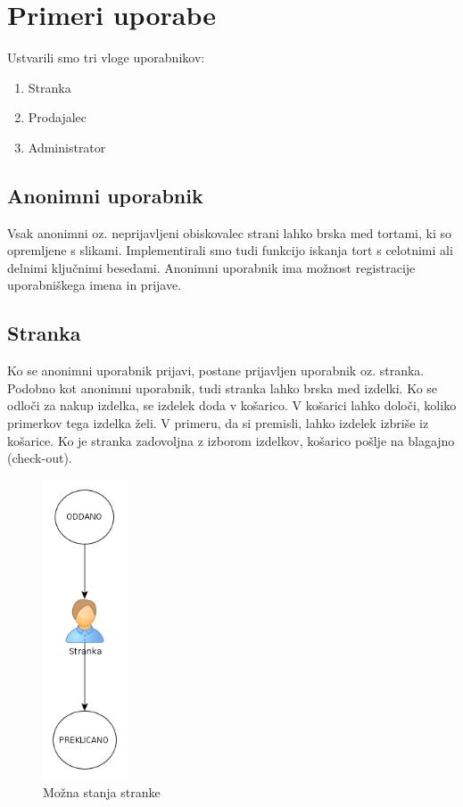 \documentclass[a4paper,12pt]{report}
\begin{document}

\chapter{Primeri uporabe}


Ustvarili smo tri vloge uporabnikov:
\begin{enumerate}
  \item Stranka
  \item Prodajalec
  \item Administrator
\end{enumerate}

\section{Anonimni uporabnik}

Vsak anonimni oz. neprijavljeni obiskovalec strani lahko brska med tortami, ki so opremljene s slikami. Implementirali smo tudi funkcijo iskanja tort s celotnimi ali delnimi ključnimi besedami. Anonimni uporabnik ima možnost registracije uporabniškega imena in prijave.

\section{Stranka}

Ko se anonimni uporabnik prijavi, postane prijavljen uporabnik oz. stranka. Podobno kot anonimni uporabnik, tudi stranka lahko brska med izdelki. Ko se odloči za nakup izdelka, se izdelek doda v košarico. V košarici lahko določi, koliko primerkov tega izdelka želi. V primeru, da si premisli, lahko izdelek izbriše iz košarice. Ko je stranka zadovoljna z izborom izdelkov, košarico pošlje na blagajno (check-out).

\begin{figure}[htb]
	\centering
	\includegraphics[width=2.5cm]{img/shema1.png}
	\caption{Možna stanja stranke}
\label{fig:1}
\end{figure}
\end{document}
